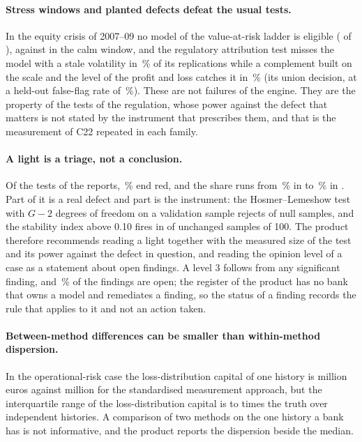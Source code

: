 \paragraph{Stress windows and planted defects defeat the usual tests.} In the equity crisis of 2007--09 no model of the value-at-risk ladder is eligible (\mkEligGfc{} of \mkNModels{}), against \mkEligCalm{} in the calm window, and the regulatory attribution test misses the model with a stale volatility in \rsCThirteenStale{}\,\% of its replications while a complement built on the scale and the level of the profit and loss catches it in \pxThirteenUnionPower{}\,\% (its union decision, at a held-out false-flag rate of \pxThirteenNullUnion{}\,\%). These are not failures of the engine. They are the property of the tests of the regulation, whose power against the defect that matters is not stated by the instrument that prescribes them, and that is the measurement of C22 repeated in each family.

\paragraph{A light is a triage, not a conclusion.} Of the \rsLightsTotal{} tests of the reports, \rsLightsRedShare{}\,\% end red, and the share runs from \rsRedLowShare{}\,\% in \rsRedLowCase{} to \rsRedHighShare{}\,\% in \rsRedHighCase{}. Part of it is a real defect and part is the instrument: the Hosmer--Lemeshow test with $G-2$ degrees of freedom on a validation sample rejects \rsCTwentyTwoHl{} of null samples, and the stability index above 0.10 fires in \rsCTwentyTwoPsi{} of unchanged samples of 100. The product therefore recommends reading a light together with the measured size of the test and its power against the defect in question, and reading the opinion level of a case as a statement about open findings. A level 3 follows from any significant finding, and \rsFindOpenShare{}\,\% of the findings are open; the register of the product has no bank that owns a model and remediates a finding, so the status of a finding records the rule that applies to it and not an action taken.

\paragraph{Between-method differences can be smaller than within-method dispersion.} In the operational-risk case the loss-distribution capital of one history is \rsCSeventeenLda{} million euros against \rsCSeventeenSma{} million for the standardised measurement approach, but the interquartile range of the loss-distribution capital is \pxTwelveIqrMin{} to \pxTwelveIqrMax{} times the truth over independent histories. A comparison of two methods on the one history a bank has is not informative, and the product reports the dispersion beside the median.

